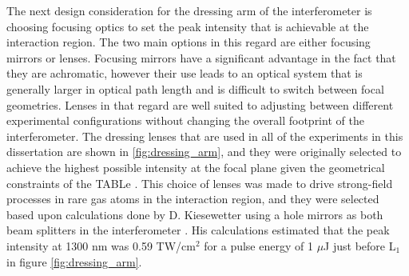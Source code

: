 The next design consideration for the dressing arm of the interferometer is choosing focusing optics to set the peak intensity that is achievable at the interaction region.  The two main options in this regard are either focusing mirrors or lenses.  Focusing mirrors have a significant advantage in the fact that they are achromatic, however their use leads to an optical system that is generally larger in optical path length and is difficult to switch between focal geometries. Lenses in that regard are well suited to adjusting between different experimental configurations without changing the overall footprint of the interferometer.  The dressing lenses that are used in all of the experiments in this dissertation are shown in \ref{fig:dressing_arm}, and they were originally selected to achieve the highest possible intensity at the focal plane given the geometrical constraints of the TABLe \cite{kiesewetterDynamicsNearThresholdAttosecond2019}. This choice of lenses was made to drive strong-field processes in rare gas atoms in the interaction region, and they were selected based upon calculations done by D. Kiesewetter using a hole mirrors as both beam splitters in the interferometer \cite{kiesewetterDynamicsNearThresholdAttosecond2019}. His calculations estimated that the peak intensity at 1300 nm was 0.59 TW/cm$^2$ for a pulse energy of 1 $\mu$J just before L$_1$ in figure \ref{fig:dressing_arm}.

